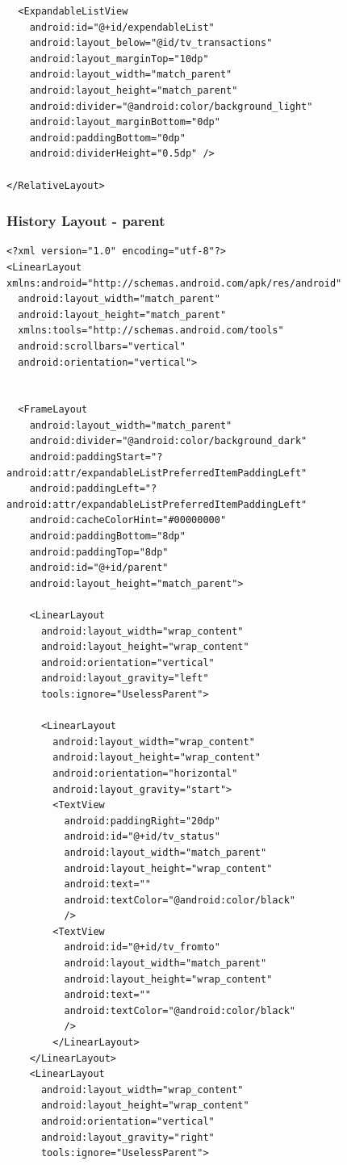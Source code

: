 \documentclass[11pt, a4paper]{article}
\begin{document}
\begin{appendices}
\begin{lstlisting}
  <ExpandableListView
    android:id="@+id/expendableList"
    android:layout_below="@id/tv_transactions"
    android:layout_marginTop="10dp"
    android:layout_width="match_parent"
    android:layout_height="match_parent"
    android:divider="@android:color/background_light"
    android:layout_marginBottom="0dp"
    android:paddingBottom="0dp"
    android:dividerHeight="0.5dp" />

</RelativeLayout>
\end{lstlisting}
\subsubsection{History Layout - parent}
\begin{lstlisting}
<?xml version="1.0" encoding="utf-8"?>
<LinearLayout xmlns:android="http://schemas.android.com/apk/res/android"
  android:layout_width="match_parent"
  android:layout_height="match_parent"
  xmlns:tools="http://schemas.android.com/tools"
  android:scrollbars="vertical"
  android:orientation="vertical">


  <FrameLayout
    android:layout_width="match_parent"
    android:divider="@android:color/background_dark"
    android:paddingStart="?android:attr/expandableListPreferredItemPaddingLeft"
    android:paddingLeft="?android:attr/expandableListPreferredItemPaddingLeft"
    android:cacheColorHint="#00000000"
    android:paddingBottom="8dp"
    android:paddingTop="8dp"
    android:id="@+id/parent"
    android:layout_height="match_parent">

    <LinearLayout
      android:layout_width="wrap_content"
      android:layout_height="wrap_content"
      android:orientation="vertical"
      android:layout_gravity="left"
      tools:ignore="UselessParent">

      <LinearLayout
        android:layout_width="wrap_content"
        android:layout_height="wrap_content"
        android:orientation="horizontal"
        android:layout_gravity="start">
        <TextView
          android:paddingRight="20dp"
          android:id="@+id/tv_status"
          android:layout_width="match_parent"
          android:layout_height="wrap_content"
          android:text=""
          android:textColor="@android:color/black"
          />
        <TextView
          android:id="@+id/tv_fromto"
          android:layout_width="match_parent"
          android:layout_height="wrap_content"
          android:text=""
          android:textColor="@android:color/black"
          />
        </LinearLayout>
    </LinearLayout>
    <LinearLayout
      android:layout_width="wrap_content"
      android:layout_height="wrap_content"
      android:orientation="vertical"
      android:layout_gravity="right"
      tools:ignore="UselessParent">


\end{lstlisting}
\end{appendices}
\end{document}

